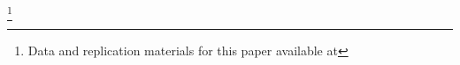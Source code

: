 \documentclass[12pt]{article}
\newcommand\blfootnote[1]{%
  \begingroup
  \renewcommand\thefootnote{}\footnote{#1}%
  \addtocounter{footnote}{-1}%
  \endgroup
}
\begin{document}
\blfootnote{Data and replication materials for this paper available at }
\end{document}
